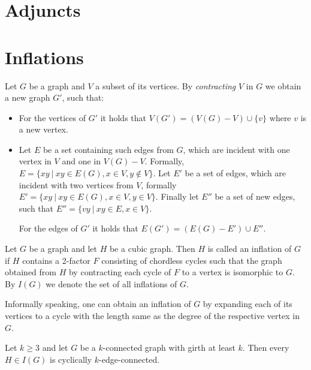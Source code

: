 \documentclass[12pt, twoside]{book}
\begin{document}

\section{Adjuncts}

\todo{}

\section{Inflations}

Let $G$ be a graph and $V$ a subset of its vertices. By \textit{contracting} $V$ in $G$ we obtain a new graph $G'$, such that:
\begin{itemize}
	\item For the vertices of $G'$ it holds that $V(G') = (V(G)-V)\cup \{v\}$ where $v$ is a new vertex.
	\item Let $E$ be a set containing such edges from $G$, which are incident with one vertex in $V$ and one in $V(G)-V$. Formally, ${E=\{xy~|~xy\in E(G), x\in V, y\notin V\}}$. Let $E'$ be a set of edges, which are incident with two vertices from $V$, formally ${E'=\{xy ~|~ xy\in E(G), x\in V, y\in V\}}$. Finally let $E''$ be a set of new edges, such that $E''=\{vy~|~ xy\in E, x\in V\}$.
	
	For the edges of $G'$ it holds that ${E(G')=(E(G)-E')\cup E''}$.
\end{itemize}

\begin{definition}
	Let $G$ be a graph and let $H$ be a cubic graph. Then $H$ is called an inflation of $G$ if $H$ contains a 2-factor $F$ consisting of chordless cycles such that the graph obtained from $H$ by contracting each cycle of $F$ to a vertex is isomorphic to $G$. By $I(G)$ we denote the set of all inflations of $G$.
\end{definition}

Informally speaking, one can obtain an inflation of $G$ by expanding each of its vertices to a cycle with the length same as the degree of the respective vertex in $G$.

\begin{theorem}\label{th:inflations-cyclic-connectivity}
	Let $k \geq 3$ and let $G$ be a $k$-connected graph with girth at least $k$. Then every $H \in I(G)$ is cyclically $k$-edge-connected.
\end{theorem}
\end{document}
